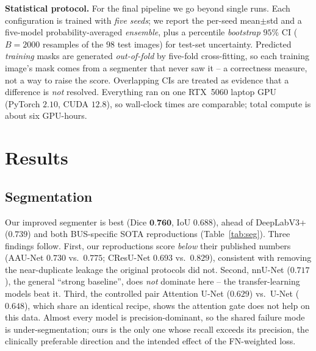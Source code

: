 \documentclass[10pt,twocolumn]{article}
\newcommand{\best}[1]{\textbf{#1}}
\begin{document}
\textbf{Statistical protocol.} For the final pipeline we go beyond single runs.
Each configuration is trained with \emph{five seeds}; we report the per-seed
mean$\pm$std and a five-model probability-averaged \emph{ensemble}, plus a
percentile \emph{bootstrap} $95\%$ CI ($B=2000$ resamples of the $98$ test images)
for test-set uncertainty. Predicted \emph{training} masks are generated
\emph{out-of-fold} by five-fold cross-fitting, so each training image's mask comes
from a segmenter that never saw it -- a correctness measure, not a way to raise the
score. Overlapping CIs are treated as evidence that a difference is \emph{not}
resolved. Everything ran on one RTX~5060 laptop GPU (PyTorch $2.10$, CUDA $12.8$),
so wall-clock times are comparable; total compute is about six GPU-hours.

\section{Results}
\subsection{Segmentation}
Our improved segmenter is best (Dice $\best{0.760}$, IoU $0.688$), ahead of
DeepLabV3+ ($0.739$) and both BUS-specific SOTA reproductions
(Table~\ref{tab:seg}). Three findings follow. First, our reproductions score
\emph{below} their published numbers (AAU-Net $0.730$ vs.\ $0.775$; CResU-Net
$0.693$ vs.\ $0.829$), consistent with removing the near-duplicate leakage the
original protocols did not. Second, nnU-Net ($0.717$), the general ``strong
baseline'', does \emph{not} dominate here -- the transfer-learning models beat it.
Third, the controlled pair Attention U-Net ($0.629$) vs.\ U-Net ($0.648$), which
share an identical recipe, shows the attention gate does not help on this data.
Almost every model is precision-dominant, so the shared failure mode is
under-segmentation; ours is the only one whose recall exceeds its precision, the
clinically preferable direction and the intended effect of the FN-weighted loss.
\end{document}
